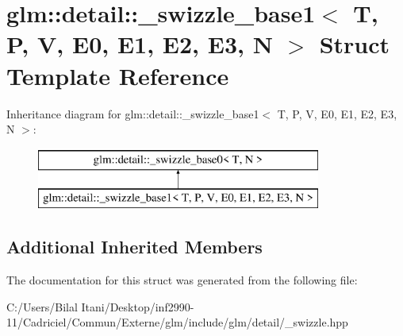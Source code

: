 \hypertarget{structglm_1_1detail_1_1__swizzle__base1}{}\section{glm\+:\+:detail\+:\+:\+\_\+swizzle\+\_\+base1$<$ T, P, V, E0, E1, E2, E3, N $>$ Struct Template Reference}
\label{structglm_1_1detail_1_1__swizzle__base1}
Inheritance diagram for glm\+:\+:detail\+:\+:\+\_\+swizzle\+\_\+base1$<$ T, P, V, E0, E1, E2, E3, N $>$\+:\begin{figure}[H]
\begin{center}
\leavevmode
\includegraphics[height=2.000000cm]{structglm_1_1detail_1_1__swizzle__base1}
\end{center}
\end{figure}
\subsection*{Additional Inherited Members}


The documentation for this struct was generated from the following file\+:\begin{DoxyCompactItemize}
\item 
C\+:/\+Users/\+Bilal Itani/\+Desktop/inf2990-\/11/\+Cadriciel/\+Commun/\+Externe/glm/include/glm/detail/\+\_\+swizzle.\+hpp\end{DoxyCompactItemize}
